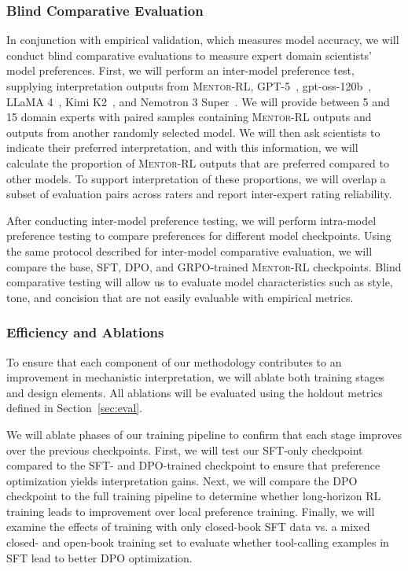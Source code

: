 \documentclass[thesis,letterpaper,12pt]{utthesis}
\begin{document}
\subsubsection{Blind Comparative Evaluation}\label{sec:blind-eval}
In conjunction with empirical validation, which measures model accuracy, we will conduct blind comparative evaluations to measure expert domain scientists' model preferences. First, we will perform an inter-model preference test, supplying interpretation outputs from \textsc{Mentor-RL}, GPT-5~\cite{gpt5}, gpt-oss-120b~\cite{gpt-oss}, LLaMA 4~\cite{llama4}, Kimi K2~\cite{kimik2}, and Nemotron 3 Super~\cite{nemotron3}. We will provide between 5 and 15 domain experts with paired samples containing \textsc{Mentor-RL} outputs and outputs from another randomly selected model. We will then ask scientists to indicate their preferred interpretation, and with this information, we will calculate the proportion of \textsc{Mentor-RL} outputs that are preferred compared to other models. To support interpretation of these proportions, we will overlap a subset of evaluation pairs across raters and report inter-expert rating reliability.

After conducting inter-model preference testing, we will perform intra-model preference testing to compare preferences for different model checkpoints. Using the same protocol described for inter-model comparative evaluation, we will compare the base, SFT, DPO, and GRPO-trained \textsc{Mentor-RL} checkpoints. Blind comparative testing will allow us to evaluate model characteristics such as style, tone, and concision that are not easily evaluable with empirical metrics.

\subsubsection{Efficiency and Ablations}
To ensure that each component of our methodology contributes to an improvement in mechanistic interpretation, we will ablate both training stages and design elements. All ablations will be evaluated using the holdout metrics defined in Section~\ref{sec:eval}.

We will ablate phases of our training pipeline to confirm that each stage improves over the previous checkpoints. First, we will test our SFT-only checkpoint compared to the SFT- and DPO-trained checkpoint to ensure that preference optimization yields interpretation gains. Next, we will compare the DPO checkpoint to the full training pipeline to determine whether long-horizon RL training leads to improvement over local preference training. Finally, we will examine the effects of training with only closed-book SFT data vs. a mixed closed- and open-book training set to evaluate whether tool-calling examples in SFT lead to better DPO optimization.
\end{document}
